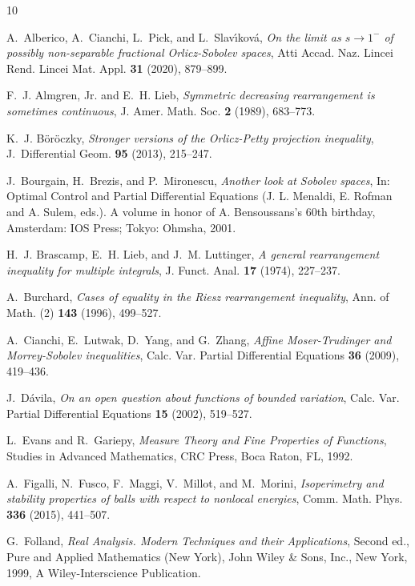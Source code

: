 \documentclass{amsart}
\begin{document}
\begin{thebibliography}{10}

A.~Alberico, A.~Cianchi, L.~Pick, and L.~Slav\'{\i}kov\'{a}, {\em On the
limit as $s \to 1^{-}$ of possibly non-separable fractional Orlicz-Sobolev
spaces}, Atti Accad. Naz. Lincei Rend. Lincei Mat. Appl. \textbf{31} (2020),
879--899.

F.~J. Almgren, Jr. and E.~H. Lieb, {\em Symmetric decreasing rearrangement
is sometimes continuous}, J. Amer. Math. Soc. \textbf{2} (1989), 683--773.

K.~J. B\"or\"oczky, {\em Stronger versions of the Orlicz-Petty projection inequality},
J.~Differential Geom. \textbf{95} (2013), 215--247.

J.~Bourgain, H.~Brezis, and P.~Mironescu, {\em Another look at Sobolev
spaces}, In: Optimal Control and Partial Differential Equations (J.
L. Menaldi, E. Rofman and A. Sulem, eds.). A volume in honor
of A. Bensoussans's 60th birthday, Amsterdam: IOS Press; Tokyo: Ohmsha,
2001.

H.~J. Brascamp, E.~H. Lieb, and J.~M. Luttinger, {\em A general rearrangement
inequality for multiple integrals}, J. Funct. Anal. \textbf{17} (1974), 227--237.

A.~Burchard, {\em Cases of equality in the Riesz rearrangement inequality},
Ann. of Math. (2) \textbf{143} (1996), 499--527.

A.~Cianchi, E.~Lutwak, D.~Yang, and G.~Zhang, {\em Affine Moser-Trudinger
and Morrey-Sobolev inequalities}, Calc. Var. Partial Differential Equations
\textbf{36} (2009), 419--436.

J.~D\'avila, {\em On an open question about functions of bounded variation},
Calc. Var. Partial Differential Equations \textbf{15} (2002), 519--527.

L.~Evans and R.~Gariepy, {\em Measure Theory and Fine Properties of Functions},
Studies in Advanced Mathematics, CRC Press, Boca Raton, FL, 1992.

A.~Figalli, N.~Fusco, F.~Maggi, V.~Millot, and M.~Morini, {\em Isoperimetry
and stability properties of balls with respect to nonlocal energies}, Comm.
Math. Phys. \textbf{336} (2015), 441--507.

G.~Folland, {\em Real Analysis. Modern Techniques and their Applications},
Second ed., Pure and Applied Mathematics (New York), John Wiley \& Sons,
Inc., New York, 1999, A Wiley-Interscience Publication.


\end{thebibliography}
\end{document}
